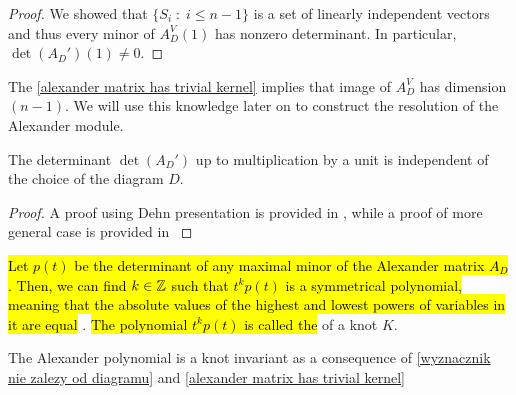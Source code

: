 \begin{proof}
  We showed that $\{S_i\;:\;i\leq n-1\}$ is a set of linearly independent vectors and thus every minor of $A_D^V(1)$ has nonzero determinant. In particular, $\det(A_D')(1)\neq 0$.
\end{proof}

The \cref{alexander matrix has trivial kernel} implies that image of $A_D^V$ has dimension $(n-1)$. We will use this knowledge later on to construct the resolution of the Alexander module.

\begin{theorem}\label{wyznacznik nie zalezy od diagramu}
  The determinant $\det(A_D')$ up to multiplication by a unit is independent of the choice of the diagram $D$.
\end{theorem}

\begin{proof}\color{red}A proof using Dehn presentation is provided in \cite{alex-oryginal}, while a proof of more general case is provided in \cite{fox} 
\end{proof}

\begin{definition}
  \hl{Let $p(t)$ be the determinant of any maximal minor of the Alexander matrix $A_D$. Then, we can find $k\in\operatorname{\mathbb{Z}}$ such that $t^kp(t)$ is a symmetrical polynomial, meaning that the absolute values of the highest and lowest powers of variables in it are equal} \cite{alex-oryginal}. \hl{The polynomial $t^kp(t)$ is called the } of a knot $K$.
\end{definition}

The Alexander polynomial is a knot invariant as a consequence of \cref{wyznacznik nie zalezy od diagramu} and \cref{alexander matrix has trivial kernel}

